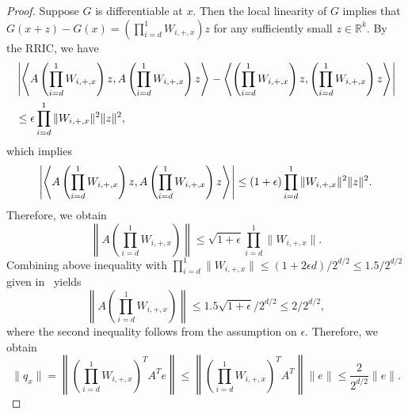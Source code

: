 \begin{proof}
Suppose $G$ is differentiable at $x$. Then the local linearity of $G$ implies that $G(x + z) - G(x) = \left(\prod_{i = d}^1 W_{i, +, x}\right) z$ for any sufficiently small $z \in \mathbb{R}^k$. By the RRIC, we have
\begin{align*}
&\left| \inner[]{ A \left(\prod_{i = d}^1 W_{i, +, x}\right) z }{A \left(\prod_{i = d}^1 W_{i, +, x}\right) z} - \inner[]{ \left(\prod_{i = d}^1 W_{i, +, x}\right) z }{\left(\prod_{i = d}^1 W_{i, +, x}\right) z} \right| \\
&\leq \epsilon \prod_{i = d}^1\| W_{i, +, x} \|^2 \|z\|^2,
\end{align*}
which implies
\begin{equation*}
\left| \inner[]{ A \left(\prod_{i = d}^1 W_{i, +, x}\right) z }{A \left(\prod_{i = d}^1 W_{i, +, x}\right) z} \right| \leq (1 + \epsilon) \prod_{i = d}^1\| W_{i, +, x} \|^2 \|z\|^2.
\end{equation*}
Therefore, we obtain
\begin{equation*}
\left\| A \left(\prod_{i = d}^1 W_{i, +, x}\right) \right\| \leq \sqrt{1 + \epsilon} \prod_{i = d}^1\| W_{i, +, x} \|.
\end{equation*}
Combining above inequality with $\prod_{i = d}^1\| W_{i, +, x} \| \leq (1 + 2 \epsilon d) / 2^{d/2} \leq 1.5 / 2^{d/2}$ given in~\cite[(10)]{HV17} yields
\begin{equation*}
\left\| A \left(\prod_{i = d}^1 W_{i, +, x}\right) \right\| \leq 1.5 \sqrt{1 + \epsilon} / 2^{d/2} \leq 2 / 2^{d/2},
\end{equation*}
where the second inequality follows from the assumption on $\epsilon$.
Therefore, we obtain
\begin{equation*}
\|q_x\| = \left\| \left(\prod_{i = d}^1 W_{i, +, x}\right)^T A^T e\right\| \leq \left\| \left(\prod_{i = d}^1 W_{i, +, x}\right)^T A^T\right\| \|e\| \leq \frac{2}{2^{d/2}} \|e\|.
\end{equation*}
\end{proof}


